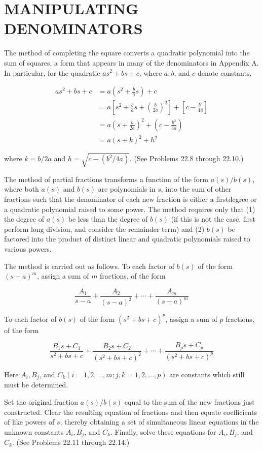 \documentclass[10pt]{article}
\begin{document}
\section*{MANIPULATING DENOMINATORS}
The method of completing the square converts a quadratic polynomial into the sum of squares, a form that appears in many of the denominators in Appendix A. In particular, for the quadratic $a s^{2}+b s+c$, where $a, b$, and $c$ denote constants,

$$
\begin{aligned}
a s^{2}+b s+c & =a\left(s^{2}+\frac{b}{a} s\right)+c \\
& =a\left[s^{2}+\frac{b}{a} s+\left(\frac{b}{2 a}\right)^{2}\right]+\left[c-\frac{b^{2}}{4 a}\right] \\
& =a\left(s+\frac{b}{2 a}\right)^{2}+\left(c-\frac{b^{2}}{4 a}\right) \\
& =a(s+k)^{2}+h^{2}
\end{aligned}
$$

where $k=b / 2 a$ and $h=\sqrt{c-\left(b^{2} / 4 a\right)}$. (See Problems 22.8 through 22.10.)

The method of partial fractions transforms a function of the form $a(s) / b(s)$, where both $a(s)$ and $b(s)$ are polynomials in $s$, into the sum of other fractions such that the denominator of each new fraction is either a firstdegree or a quadratic polynomial raised to some power. The method requires only that (1) the degree of $a(s)$ be less than the degree of $b(s)$ (if this is not the case, first perform long division, and consider the remainder term) and (2) $b(s)$ be factored into the product of distinct linear and quadratic polynomials raised to various powers.

The method is carried out as follows. To each factor of $b(s)$ of the form $(s-a)^{m}$, assign a sum of $m$ fractions, of the form

$$
\frac{A_{1}}{s-a}+\frac{A_{2}}{(s-a)^{2}}+\cdots+\frac{A_{m}}{(s-a)^{m}}
$$

To each factor of $b(s)$ of the form $\left(s^{2}+b s+c\right)^{p}$, assign a sum of $p$ fractions, of the form

$$
\frac{B_{1} s+C_{1}}{s^{2}+b s+c}+\frac{B_{2} s+C_{2}}{\left(s^{2}+b s+c\right)^{2}}+\cdots+\frac{B_{p} s+C_{p}}{\left(s^{2}+b s+c\right)^{p}}
$$

Here $A_{i}, B_{j}$, and $C_{k}(i=1,2, \ldots, m ; j, k=1,2, \ldots, p)$ are constants which still must be determined.

Set the original fraction $a(s) / b(s)$ equal to the sum of the new fractions just constructed. Clear the resulting equation of fractions and then equate coefficients of like powers of $s$, thereby obtaining a set of simultaneous linear equations in the unknown constants $A_{i}, B_{j}$, and $C_{k}$. Finally, solve these equations for $A_{i}, B_{j}$, and $C_{k}$. (See Problems 22.11 through 22.14.)
\end{document}
